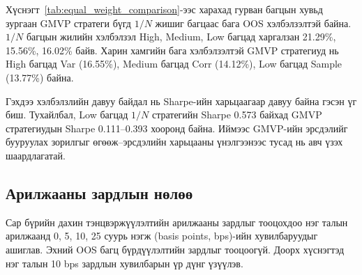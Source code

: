 Хүснэгт~\ref{tab:equal_weight_comparison}-ээс
харахад гурван багцын хувьд зургаан GMVP
стратеги бүгд $1/N$ жишиг багцаас
бага OOS хэлбэлзэлтэй байна.
$1/N$ багцын жилийн хэлбэлзэл High,
Medium, Low багцад харгалзан
21.29\%, 15.56\%, 16.02\% байв.
Харин хамгийн бага хэлбэлзэлтэй
GMVP стратегиуд нь High багцад Var
(16.55\%), Medium багцад Corr (14.12\%),
Low багцад Sample (13.77\%) байна.

Гэхдээ хэлбэлзлийн давуу байдал нь
Sharpe-ийн харьцаагаар давуу байна
гэсэн үг биш. Тухайлбал, Low багцад
$1/N$ стратегийн Sharpe 0.573 байхад
GMVP стратегиудын Sharpe 0.111--0.393
хооронд байна. Иймээс GMVP-ийн
эрсдэлийг бууруулах зорилгыг
өгөөж--эрсдэлийн харьцааны үнэлгээнээс
тусад нь авч үзэх шаардлагатай.

\subsection{Арилжааны зардлын нөлөө}
\label{subsec:trading_cost_results}

Сар бүрийн дахин тэнцвэржүүлэлтийн
арилжааны зардлыг тооцохдоо нэг талын
арилжаанд 0, 5, 10, 25 суурь нэгж
(basis points, bps)-ийн хувилбаруудыг
ашиглав. Эхний OOS багц бүрдүүлэлтийн
зардлыг тооцоогүй. Доорх хүснэгтэд
нэг талын 10 bps зардлын хувилбарын
үр дүнг үзүүлэв.


